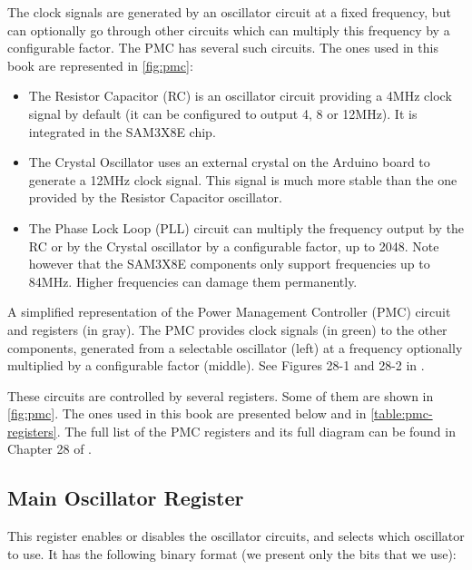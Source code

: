 The clock signals are generated by an oscillator circuit at a fixed frequency,
but can optionally go through other circuits which can multiply this frequency
by a configurable factor. The PMC has several such circuits. The ones used in
this book are represented in \cref{fig:pmc}:
\begin{itemize}
  \item The Resistor Capacitor (RC) is an oscillator circuit providing a 4MHz
  clock signal by default (it can be configured to output 4, 8 or 12MHz). It is
  integrated in the SAM3X8E chip.

  \item The Crystal Oscillator uses an external crystal on the Arduino board to
  generate a 12MHz clock signal. This signal is much more stable than the one
  provided by the Resistor Capacitor oscillator.

  \item The Phase Lock Loop (PLL) circuit can multiply the frequency output by
  the RC or by the Crystal oscillator by a configurable factor, up to 2048.
  Note however that the SAM3X8E components only support frequencies up to
  84MHz. Higher frequencies can damage them permanently.
\end{itemize}

\begin{Figure}
  

  \caption{A simplified representation of the Power Management Controller (PMC)
  circuit and registers (in gray). The PMC provides clock signals (in green) to
  the other components, generated from a selectable oscillator (left) at a
  frequency optionally multiplied by a configurable factor (middle). See
  Figures 28-1 and 28-2 in \cite{SAM3X8E}.}\label{fig:pmc}
\end{Figure}

These circuits are controlled by several registers. Some of them are shown in
\cref{fig:pmc}. The ones used in this book are presented below and in
\cref{table:pmc-registers}. The
full list of the PMC registers and its full diagram can be found in Chapter 28
of \cite{SAM3X8E}.

\subsection{Main Oscillator Register}

This register enables or disables the oscillator circuits, and selects which
oscillator to use. It has the following binary format (we present only the bits
that we use):

